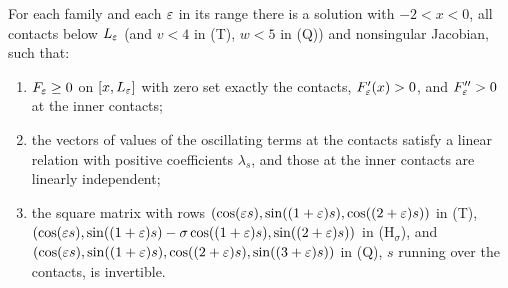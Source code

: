 \begin{lemma}\label{zfg:lem:certs}
For each family and each $\varepsilon$ in its range there is a solution with $-2<x<0$, all contacts below $L_\varepsilon$ (and
$v<4$ in (T), $w<5$ in (Q)) and nonsingular Jacobian, such that:
\begin{enumerate}
\item $F_\varepsilon\ge0$ on $[x,L_\varepsilon]$ with zero set exactly the contacts, $F_\varepsilon'(x)>0$, and $F_\varepsilon''>0$ at the inner contacts;
\item the vectors of values of the oscillating terms at the contacts satisfy a linear relation with positive
coefficients $\lambda_s$, and those at the inner contacts are linearly independent;
\item the square matrix with rows $(\cos(\varepsilon s),\sin((1+\varepsilon)s),\cos((2+\varepsilon)s))$ in (T),
$(\cos(\varepsilon s),\sin((1+\varepsilon)s)-\sigma\cos((1+\varepsilon)s),\sin((2+\varepsilon)s))$ in (H$_\sigma$), and
$(\cos(\varepsilon s),\sin((1+\varepsilon)s),\cos((2+\varepsilon)s),\sin((3+\varepsilon)s))$ in (Q), $s$ running over the contacts, is invertible.
\end{enumerate}
\end{lemma}

